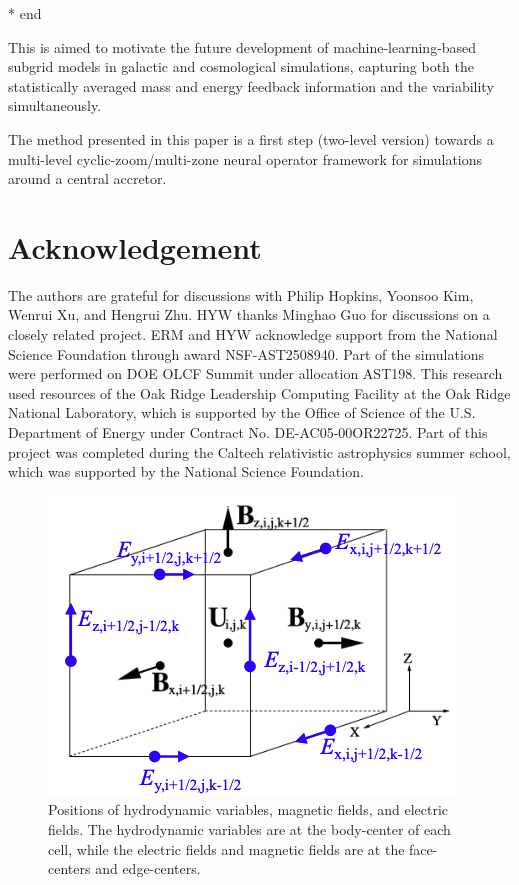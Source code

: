 \documentclass[%
 reprint,
 superscriptaddress,
 amsmath,amssymb,
 nofootinbib,
 prd,
]{revtex4-2}
\newcommand{\hywcom}[1]{{\color{purple}{[HYW: #1]}}}
\begin{document}
* end

This is aimed to motivate the future development of machine-learning-based subgrid models in galactic and cosmological simulations, capturing both the statistically averaged mass and energy feedback information and the variability simultaneously.

\hywcom{Future Prospective.}
The method presented in this paper is a first step (two-level version) towards a multi-level cyclic-zoom/multi-zone neural operator framework for simulations around a central accretor.

\section{Acknowledgement}
The authors are grateful for discussions with Philip Hopkins, Yoonsoo Kim, Wenrui Xu, and Hengrui Zhu.
HYW thanks Minghao Guo for discussions on a closely related project.
ERM and HYW acknowledge support from the National Science Foundation through award NSF-AST2508940.
Part of the simulations were performed on DOE OLCF Summit under allocation AST198.
This research used resources of the Oak Ridge Leadership Computing Facility at the Oak Ridge National Laboratory, which is supported by the Office of Science of the U.S. Department of Energy under Contract No. DE-AC05-00OR22725. 
Part of this project was completed during the Caltech relativistic astrophysics summer school, which was supported by the National Science Foundation. 



\clearpage

\appendix
\onecolumngrid

\begin{figure}
    \centering
    \includegraphics[width=0.3\linewidth]{figures/ct.png}
    \caption{
    Positions of hydrodynamic variables, magnetic fields, and electric fields. The hydrodynamic variables are at the body-center of each cell, while the electric fields and magnetic fields are at the face-centers and edge-centers.
    } 
    \label{fig:ct}
\end{figure}
\end{document}
